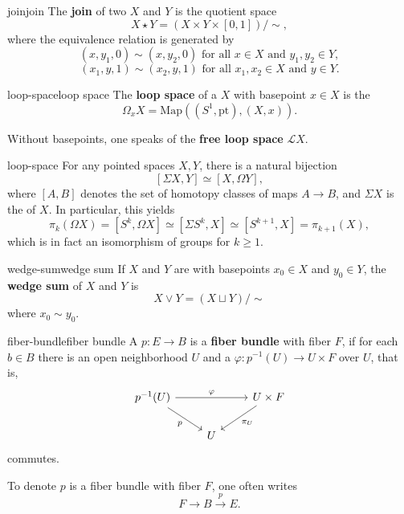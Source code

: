 \begin{topic}{join}{join}
    The \textbf{join} of two  $X$ and $Y$ is the quotient space
    \[ X \star Y = (X \times Y \times [0, 1]) / \sim{} , \]
    where the equivalence relation is generated by
    \[ (x, y_1, 0) \sim{} (x, y_2, 0) \text{ for all } x \in X \text{ and } y_1, y_2 \in Y , \]
    \[ (x_1, y, 1) \sim{} (x_2, y, 1) \text{ for all } x_1, x_2 \in X \text{ and } y \in Y . \]
\end{topic}

\begin{topic}{loop-space}{loop space}
    The \textbf{loop space} of a  $X$ with basepoint $x \in X$ is the 
    \[ \Omega_x X = \text{Map}((S^1, \text{pt}), (X, x)) . \]
    
    Without basepoints, one speaks of the \textbf{free loop space} $\mathcal{L} X$.
\end{topic}

\begin{example}{loop-space}
    For any pointed spaces $X, Y$, there is a natural bijection
    \[ [\Sigma X, Y] \simeq [X, \Omega Y], \]
    where $[A, B]$ denotes the set of homotopy classes of maps $A \to B$, and $\Sigma X$ is the  of $X$.
    In particular, this yields
    \[ \pi_k(\Omega X) = [ S^k, \Omega X ] \simeq [ \Sigma S^k, X ] \simeq [ S^{k + 1}, X ] = \pi_{k + 1}(X) , \]
    which is in fact an isomorphism of groups for $k \ge 1$.
\end{example}

\begin{topic}{wedge-sum}{wedge sum}
    If $X$ and $Y$ are  with basepoints $x_0 \in X$ and $y_0 \in Y$, the \textbf{wedge sum} of $X$ and $Y$ is 
    \[ X \vee Y = (X \sqcup Y) / \sim{} \]
    where $x_0 \sim{} y_0$.
\end{topic}

\begin{topic}{fiber-bundle}{fiber bundle}
    A  $p : E \to B$ is a \textbf{fiber bundle} with fiber $F$, if for each $b \in B$ there is an open neighborhood $U$ and a  $\varphi : p^{-1}(U) \to U \times F$ over $U$, that is,
    \[ \begin{tikzcd}
        p^{-1}(U) \arrow{rr}{\varphi} \arrow[swap]{dr}{p} && U \times F \arrow{ld}{\pi_U} \\ & U &
    \end{tikzcd} \]
    commutes.
    
    To denote $p$ is a fiber bundle with fiber $F$, one often writes
    \[ F \to B \xrightarrow{p} E . \]
\end{topic}

